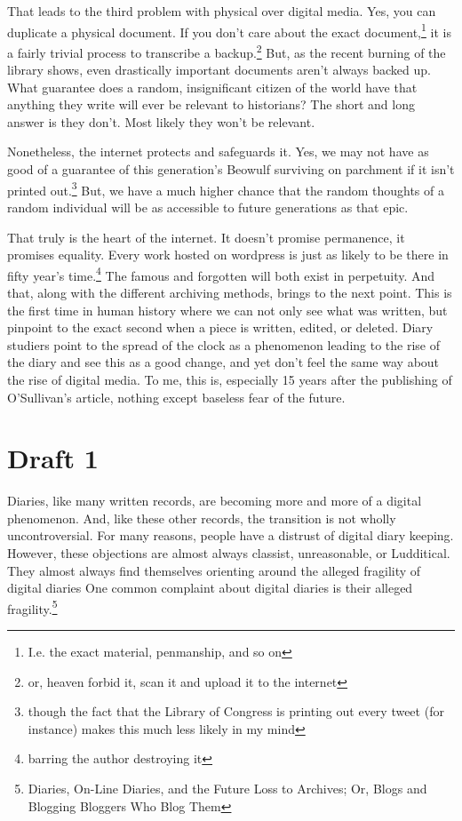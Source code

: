 \documentclass[12pt]{article}[titlepage]
\newcommand{\1}{\={a}}
\newcommand{\2}{\={e}}
\newcommand{\3}{\={\i}}
\newcommand{\4}{\=o}
\newcommand{\5}{\=u}
\newcommand{\6}{\={A}}
\renewcommand{\,}{\textsuperscript{,}}
\begin{document}
That leads to the third problem with physical over digital media.
Yes, you can duplicate a physical document.
If you don’t care about the exact document,\footnote{I.e. the exact material, penmanship, and so on} it is a fairly trivial process to transcribe a backup.\footnote{or, heaven forbid it, scan it and upload it to the internet}
But, as the recent burning of the library shows, even drastically important documents aren’t always backed up.
What guarantee does a random, insignificant citizen of the world have that anything they write will ever be relevant to historians?
The short and long answer is they don’t.
Most likely they won’t be relevant.

Nonetheless, the internet protects and safeguards it.
Yes, we may not have as good of a guarantee of this generation’s Beowulf surviving on parchment if it isn’t printed out.\footnote{though the fact that the Library of Congress is printing out every tweet (for instance) makes this much less likely in my mind}
But, we have a much higher chance that the random thoughts of a random individual will be as accessible to future generations as that epic.

That truly is the heart of the internet.
It doesn’t promise permanence, it promises equality.
Every work hosted on wordpress is just as likely to be there in fifty year’s time.\footnote{barring the author destroying it}
The famous and forgotten will both exist in perpetuity.
And that, along with the different archiving methods, brings to the next point.
This is the first time in human history where we can not only see what was written, but pinpoint to the exact second when a piece is written, edited, or deleted.
Diary studiers point to the spread of the clock as a phenomenon leading to the rise of the diary and see this as a good change, and yet don’t feel the same way about the rise of digital media.
To me, this is, especially 15 years after the publishing of O’Sullivan’s article, nothing except baseless fear of the future.

\section{Draft 1}
Diaries, like many written records, are becoming more and more of a digital phenomenon.
And, like these other records, the transition is not wholly uncontroversial.
For many reasons, people have a distrust of digital diary keeping.
However, these objections are almost always classist, unreasonable, or Ludditical.
They almost always find themselves orienting around the alleged fragility of digital diaries
One common complaint about digital diaries is their alleged fragility.\footnote{Diaries, On-Line Diaries, and the Future Loss to Archives; Or, Blogs and Blogging Bloggers Who Blog Them}
\end{document}
